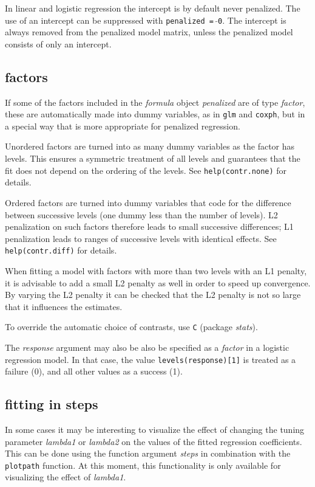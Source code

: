 \documentclass[a4paper]{article}
\newcommand{\Robject}[1]{{\texttt{#1}}}
\newcommand{\Rfunction}[1]{{\texttt{#1}}}
\newcommand{\Rpackage}[1]{{\textit{#1}}}
\newcommand{\Rclass}[1]{{\textit{#1}}}
\newcommand{\Rfunarg}[1]{{\textit{#1}}}
\begin{document}
In linear and logistic regression the intercept is by default never penalized. The use of an intercept can be suppressed with \Robject{penalized = $\tilde{}$0}. The intercept is always removed from the penalized model matrix, unless the penalized model consists of only an intercept.


\subsection{factors}

If some of the factors included in the \Rclass{formula} object \Rfunarg{penalized} are of type \Rclass{factor}, these are automatically made into dummy variables, as in \Rfunction{glm} and \Rfunction{coxph}, but in a special way that is more appropriate for penalized regression.

Unordered factors are turned into as many dummy variables as the factor has levels. This ensures a symmetric treatment of all levels and guarantees that the fit does not depend on the ordering of the levels. See \Robject{help(contr.none)} for details.

Ordered factors are turned into dummy variables that code for the difference between successive levels (one dummy less than the number of levels). L2 penalization on such factors therefore leads to small successive differences; L1 penalization leads to ranges of successive levels with identical effects. See \Robject{help(contr.diff)} for details.

When fitting a model with factors with more than two levels with an L1 penalty, it is advisable to add a small L2 penalty as well in order to speed up convergence. By varying the L2 penalty it can be checked that the L2 penalty is not so large that it influences the estimates.

To override the automatic choice of contrasts, use \Rfunction{C} (package \Rpackage{stats}).

The \Rfunarg{response} argument may also be also be specified as a \Rclass{factor} in a logistic regression model. In that case, the value \Robject{levels(response)[1]} is treated as a failure (0), and all other values as a success (1).


\subsection{fitting in steps}

In some cases it may be interesting to visualize the effect of changing the tuning parameter \Rfunarg{lambda1} or \Rfunarg{lambda2} on the values of the fitted regression coefficients. This can be done using the function argument \Rfunarg{steps} in combination with the \Rfunction{plotpath} function. At this moment, this functionality is only available for visualizing the effect of \Rfunarg{lambda1}.
\end{document}
